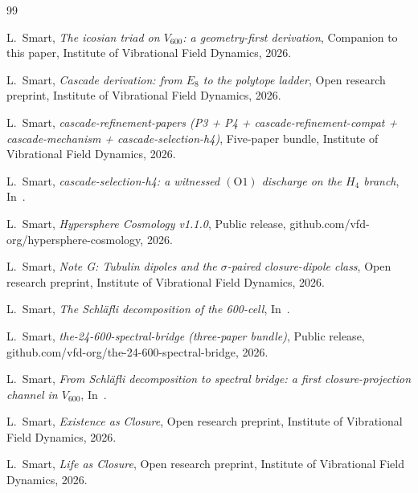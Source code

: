 \documentclass[11pt,a4paper]{article}
\theoremstyle{definition}
\theoremstyle{remark}
\begin{document}

\begin{thebibliography}{99}

L.~Smart,
\emph{The icosian triad on $V_{600}$: a geometry-first derivation},
Companion to this paper, Institute of Vibrational Field Dynamics, 2026.

L.~Smart,
\emph{Cascade derivation: from $E_8$ to the polytope ladder},
Open research preprint, Institute of Vibrational Field Dynamics, 2026.

L.~Smart,
\emph{cascade-refinement-papers (P3 + P4 + cascade-refinement-compat + cascade-mechanism + cascade-selection-h4)},
Five-paper bundle, Institute of Vibrational Field Dynamics, 2026.

L.~Smart,
\emph{cascade-selection-h4: a witnessed $(\mathrm{O}1)$ discharge on the $H_4$ branch},
In~\cite{cascadeRefinementPapers}.

L.~Smart,
\emph{Hypersphere Cosmology v1.1.0},
Public release, github.com/vfd-org/hypersphere-cosmology, 2026.

L.~Smart,
\emph{Note G: Tubulin dipoles and the $\sigma$-paired closure-dipole class},
Open research preprint, Institute of Vibrational Field Dynamics, 2026.

L.~Smart,
\emph{The Schl\"afli decomposition of the 600-cell},
In~\cite{spectralBridge24600}.

L.~Smart,
\emph{the-24-600-spectral-bridge (three-paper bundle)},
Public release, github.com/vfd-org/the-24-600-spectral-bridge, 2026.

L.~Smart,
\emph{From Schl\"afli decomposition to spectral bridge: a first closure-projection channel in $V_{600}$},
In~\cite{spectralBridge24600}.

L.~Smart,
\emph{Existence as Closure},
Open research preprint, Institute of Vibrational Field Dynamics, 2026.

L.~Smart,
\emph{Life as Closure},
Open research preprint, Institute of Vibrational Field Dynamics, 2026.

\end{thebibliography}
\end{document}
